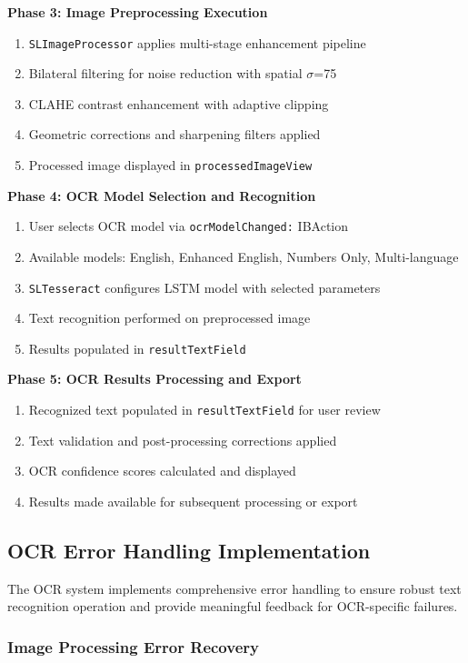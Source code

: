 \textbf{Phase 3: Image Preprocessing Execution}
\begin{enumerate}
\item \texttt{SLImageProcessor} applies multi-stage enhancement pipeline
\item Bilateral filtering for noise reduction with spatial $\sigma$=75
\item CLAHE contrast enhancement with adaptive clipping
\item Geometric corrections and sharpening filters applied
\item Processed image displayed in \texttt{processedImageView}
\end{enumerate}

\textbf{Phase 4: OCR Model Selection and Recognition}
\begin{enumerate}
\item User selects OCR model via \texttt{ocrModelChanged:} IBAction
\item Available models: English, Enhanced English, Numbers Only, Multi-language
\item \texttt{SLTesseract} configures LSTM model with selected parameters
\item Text recognition performed on preprocessed image
\item Results populated in \texttt{resultTextField}
\end{enumerate}

\textbf{Phase 5: OCR Results Processing and Export}
\begin{enumerate}
\item Recognized text populated in \texttt{resultTextField} for user review
\item Text validation and post-processing corrections applied
\item OCR confidence scores calculated and displayed
\item Results made available for subsequent processing or export
\end{enumerate}

\subsection{OCR Error Handling Implementation}

The OCR system implements comprehensive error handling to ensure robust text recognition operation and provide meaningful feedback for OCR-specific failures.

\subsubsection{Image Processing Error Recovery}

